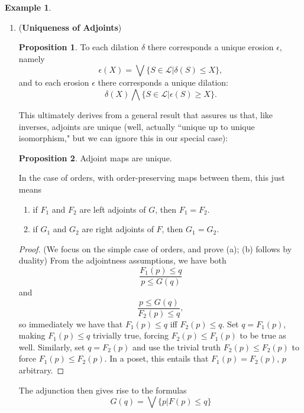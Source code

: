 \documentclass[11pt]{book}
\theoremstyle{definition}
\newtheorem{example}{Example}[section]
\theoremstyle{definition}
\theoremstyle{definition}
\newtheorem{proposition}{Proposition}[section]
\theoremstyle{theorem}
\theoremstyle{definition}
\begin{document}
\begin{example}
\begin{enumerate}
	\item (\textbf{Uniqueness of Adjoints}) 
	\begin{proposition} To each dilation $\delta$ there corresponds a unique erosion $\epsilon$, namely 
	\begin{equation*}
	\epsilon(X) = \bigvee \{S \in \mathcal{L}| \delta(S) \leq X\},
	\end{equation*}
	and to each erosion $\epsilon$ there corresponds a unique dilation: 
	\begin{equation*}
	\delta(X) \bigwedge \{S \in \mathcal{L}| \epsilon(S) \geq X\}.
	\end{equation*}
	\end{proposition} 
	This ultimately derives from a general result that assures us that, like inverses, adjoints are unique (well, actually ``unique up to unique isomorphism," but we can ignore this in our special case): 
	\begin{proposition}
		Adjoint maps are unique.
	\end{proposition} 
In the case of orders, with order-preserving maps between them, this just means 
\begin{enumerate}
	\item if $F_1$ and $F_2$ are left adjoints of $G$, then $F_1 = F_2$. 
	\item if $G_1$ and $G_2$ are right adjoints of $F$, then $G_1 = G_2$.
\end{enumerate}
\begin{proof}
	(We focus on the simple case of orders, and prove (a); (b) follows by duality) From the adjointness assumptions, we have both  
	\begin{equation*}
	\frac{F_1(p) \leq q}{p \leq G(q)}
	\end{equation*}
	and 
	\begin{equation*}
	\frac{p \leq G(q)}{F_2(p) \leq q}, 
	\end{equation*}
	so immediately we have that $F_1(p) \leq q$ iff $F_2(p) \leq q$. Set $q = F_1(p)$, making $F_1(p) \leq q$ trivially true, forcing $F_2(p) \leq F_1(p)$ to be true as well. Similarly, set $q = F_2(p)$ and use the trivial truth $F_2(p) \leq F_2(p)$ to force $F_1(p) \leq F_2(p)$. In a poset, this entails that $F_1(p) = F_2(p)$, $p$ arbitrary. 
\end{proof}
The adjunction then gives rise to the formulas 
\begin{equation*}
G(q) = \bigvee \{p|F(p) \leq q\}
\end{equation*}

\end{enumerate}
\end{example}
\end{document}
